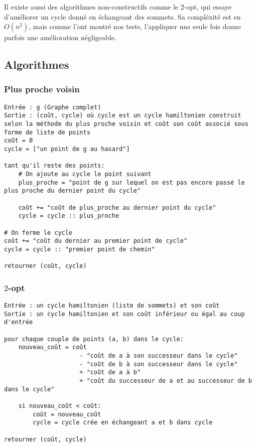 \documentclass{scrartcl}
\begin{document}
    Il existe aussi des algorithmes non-constructifs comme le 2-opt, qui essaye
    d'améliorer un cycle donné en échangeant des sommets. Sa compléxité est en
    $O(n^2)$, mais comme l'ont montré nos tests, l'appliquer une seule fois
    donne parfois une amélioration négligeable.

  \subsection{Algorithmes}
    \subsubsection{Plus proche voisin}
      \begin{lstlisting}
Entrée : g (Graphe complet)
Sortie : (coût, cycle) où cycle est un cycle hamiltonien construit selon la méthode du plus proche voisin et coût son coût associé sous forme de liste de points
coût = 0
cycle = ["un point de g au hasard"]

tant qu'il reste des points:
    # On ajoute au cycle le point suivant
    plus_proche = "point de g sur lequel on est pas encore passé le plus proche du dernier point du cycle"

    coût += "coût de plus_proche au dernier point du cycle"
    cycle = cycle :: plus_proche

# On ferme le cycle
coût += "coût du dernier au premier point de cycle"
cycle = cycle :: "premier point de chemin"

retourner (coût, cycle)
      \end{lstlisting}

    \subsubsection{$2$-opt}
      \begin{lstlisting}
Entrée : un cycle hamiltonien (liste de sommets) et son coût
Sortie : un cycle hamiltonien et son coût inférieur ou égal au coup d'entrée

pour chaque couple de points (a, b) dans le cycle:
    nouveau_coût = coût
                     - "coût de a à son successeur dans le cycle"
                     - "coût de b à son successeur dans le cycle"
                     + "coût de a à b"
                     + "coût du successeur de a et au successeur de b dans le cycle"

    si nouveau_coût < coût:
        coût = nouveau_coût
        cycle = cycle crée en échangeant a et b dans cycle

retourner (coût, cycle)
      \end{lstlisting}
\end{document}
